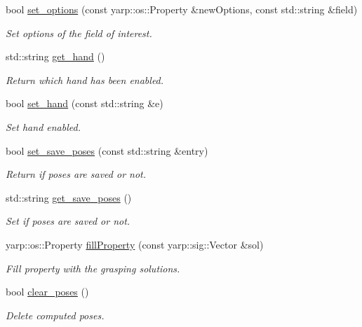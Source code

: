 \begin{DoxyCompactItemize}
bool \hyperlink{classGraspingModule_a849c459ef9700c93b45ef6cff394f675}{set\+\_\+options} (const yarp\+::os\+::\+Property \&new\+Options, const std\+::string \&field)
\begin{DoxyCompactList}\small\item\em Set options of the field of interest. \end{DoxyCompactList}\item 
std\+::string \hyperlink{classGraspingModule_a557a87131c7396dd62c02eced7f4a937}{get\+\_\+hand} ()
\begin{DoxyCompactList}\small\item\em Return which hand has been enabled. \end{DoxyCompactList}\item 
bool \hyperlink{classGraspingModule_a9d34cb0521f86dd16648255e640eec90}{set\+\_\+hand} (const std\+::string \&e)
\begin{DoxyCompactList}\small\item\em Set hand enabled. \end{DoxyCompactList}\item 
bool \hyperlink{classGraspingModule_a618785dec349358760a05e6e4b097866}{set\+\_\+save\+\_\+poses} (const std\+::string \&entry)
\begin{DoxyCompactList}\small\item\em Return if poses are saved or not. \end{DoxyCompactList}\item 
std\+::string \hyperlink{classGraspingModule_a949e4297bdf26f564669ffc91068c4f3}{get\+\_\+save\+\_\+poses} ()
\begin{DoxyCompactList}\small\item\em Set if poses are saved or not. \end{DoxyCompactList}\item 
yarp\+::os\+::\+Property \hyperlink{classGraspingModule_a059da011f804acd1adc4549eaa3d2141}{fill\+Property} (const yarp\+::sig\+::\+Vector \&sol)
\begin{DoxyCompactList}\small\item\em Fill property with the grasping solutions. \end{DoxyCompactList}\item 
bool \hyperlink{classGraspingModule_a834e972a2a1b7b92bf8dc1e83319b028}{clear\+\_\+poses} ()
\begin{DoxyCompactList}\small\item\em Delete computed poses. \end{DoxyCompactList}\item 

\end{DoxyCompactItemize}
